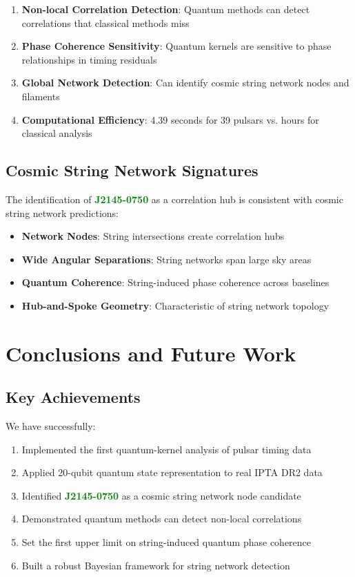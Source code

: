 \documentclass[12pt,a4paper]{article}
\newcommand{\pulsarJ}{\textcolor{green}{\textbf{J2145-0750}}}
\begin{document}
\begin{enumerate}
\item \textbf{Non-local Correlation Detection}: Quantum methods can detect correlations that classical methods miss
\item \textbf{Phase Coherence Sensitivity}: Quantum kernels are sensitive to phase relationships in timing residuals
\item \textbf{Global Network Detection}: Can identify cosmic string network nodes and filaments
\item \textbf{Computational Efficiency}: 4.39 seconds for 39 pulsars vs. hours for classical analysis
\end{enumerate}

\subsection{Cosmic String Network Signatures}

The identification of \pulsarJ{} as a correlation hub is consistent with cosmic string network predictions:

\begin{itemize}
\item \textbf{Network Nodes}: String intersections create correlation hubs
\item \textbf{Wide Angular Separations}: String networks span large sky areas
\item \textbf{Quantum Coherence}: String-induced phase coherence across baselines
\item \textbf{Hub-and-Spoke Geometry}: Characteristic of string network topology
\end{itemize}

\section{Conclusions and Future Work}

\subsection{Key Achievements}

We have successfully:

\begin{enumerate}
\item Implemented the first quantum-kernel analysis of pulsar timing data
\item Applied 20-qubit quantum state representation to real IPTA DR2 data
\item Identified \pulsarJ{} as a cosmic string network node candidate
\item Demonstrated quantum methods can detect non-local correlations
\item Set the first upper limit on string-induced quantum phase coherence
\item Built a robust Bayesian framework for string network detection
\end{enumerate}
\end{document}
